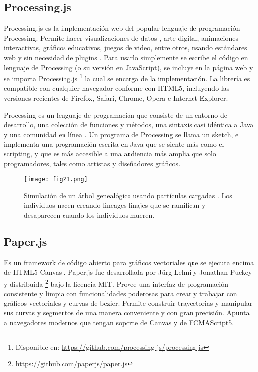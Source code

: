 
\subsection{Processing.js}

Processing.js es la implementación web del popular lenguaje de programación Processing. Permite hacer visualizaciones de datos , arte digital, animaciones interactivas, gráficos educativos, juegos de video, entre otros, usando estándares web y sin necesidad de plugins \cite{ProcJS}. Para usarlo simplemente se escribe el código en lenguaje de Processing (o su versión en JavaScript), se incluye en la página web y se importa Processing.js \footnote{Disponible en: \url{https://github.com/processing-js/processing-js}} la cual se encarga de la implementación. La librería es compatible con cualquier navegador conforme con HTML5, incluyendo las versiones recientes de Firefox, Safari, Chrome, Opera e Internet Explorer.

Processing es un lenguaje de programación que consiste de un entorno de desarrollo, una colección de funciones y métodos, una sintaxis casi idéntica a Java y una comunidad en línea \cite{Fry07}. Un programa de Processing se llama un sketch, e implementa una programación escrita en Java que se siente más como el scripting, y que es más accesible a una audiencia más amplia que solo programadores, tales como artistas y diseñadores gráficos.

\begin{figure}[htp]
  \centering
  \texttt{[image: fig21.png]}
  \caption[Simulación de un árbol genealógico usando partículas cargadas usando Processing.js]{Simulación de un árbol genealógico usando partículas cargadas \protect\footnotemark. Los individuos nacen creando lineages linajes que se ramifican y desaparecen cuando los individuos mueren.}
  \label{fig:fig21}
\end{figure}

\subsection{Paper.js}


Es un framework de código abierto para gráficos vectoriales que se ejecuta encima de HTML5 Canvas \cite{PaperJS}. Paper.js fue desarrollada por Jürg Lehni y Jonathan Puckey y distribuida \footnote{\url{https://github.com/paperjs/paper.js}} bajo la licencia MIT. Provee una interfaz de programación consistente y limpia con funcionalidades poderosas para crear y trabajar con gráficos vectoriales y curvas de bezier. Permite construir trayectorias y manipular sus curvas y segmentos de una manera conveniente y con gran precisión. Apunta a navegadores modernos que tengan soporte de Canvas y de ECMAScript5.

